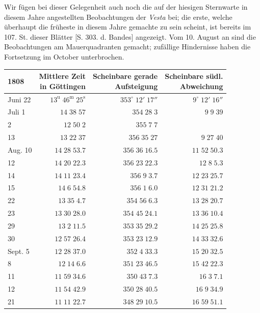 \par\indent Wir fügen bei dieser Gelegenheit auch noch die auf der hiesigen Sternwarte in diesem Jahre angestellten Beobachtungen der \emph{Vesta} bei; die erste, welche überhaupt die früheste in diesem Jahre gemachte zu sein scheint, ist bereits im 107. St. dieser Blätter [S. 303. d. Bandes] angezeigt. Vom 10. August an sind die Beobachtungen am Mauerquadranten gemacht; zufällige Hindernisse haben die Fortsetzung im October unterbrochen.


\begin{center}\fontsize{10}{12}\selectfont\setlength{\tabcolsep}{5pt}\renewcommand{\arraystretch}{1.15}\begin{tabular}{lrrr}
1808 & \shortstack{Mittlere Zeit\\in Göttingen} & \shortstack{Scheinbare gerade\\Aufsteigung} & \shortstack{Scheinbare südl.\\Abweichung}\\
\hline
Juni 22 & $13^{\text{u}}\;46^{\text{m}}\;25^{\text{s}}$ & $353^\circ\;12'\;17''$ & $9^\circ\;12'\;16''$\\
Juli  1 & $14\;38\;57$ & $354\;28\;3$ & $9\;9\;39$\\
2 & $12\;50\;2$ & $355\;7\;7$ & \\
13 & $13\;22\;37$ & $356\;35\;27$ & $9\;27\;40$\\
Aug. 10 & $14\;28\;53.7$ & $356\;36\;16.5$ & $11\;52\;50.3$\\
12 & $14\;20\;22.3$ & $356\;23\;22.3$ & $12\;8\;5.3$\\
14 & $14\;11\;23.4$ & $356\;9\;3.7$ & $12\;23\;25.7$\\
15 & $14\;6\;54.8$ & $356\;1\;6.0$ & $12\;31\;21.2$\\
22 & $13\;35\;4.7$ & $354\;56\;6.3$ & $13\;28\;20.7$\\
23 & $13\;30\;28.0$ & $354\;45\;24.1$ & $13\;36\;10.4$\\
29 & $13\;2\;11.5$ & $353\;35\;29.2$ & $14\;25\;25.8$\\
30 & $12\;57\;26.4$ & $353\;23\;12.9$ & $14\;33\;32.6$\\
Sept. 5 & $12\;28\;37.0$ & $352\;4\;33.3$ & $15\;20\;32.5$\\
8 & $12\;14\;6.6$ & $351\;23\;46.5$ & $15\;42\;22.3$\\
11 & $11\;59\;34.6$ & $350\;43\;7.3$ & $16\;3\;7.1$\\
12 & $11\;54\;42.9$ & $350\;28\;40.5$ & $16\;9\;34.9$\\
21 & $11\;11\;22.7$ & $348\;29\;10.5$ & $16\;59\;51.1$\\
\end{tabular}\end{center}


